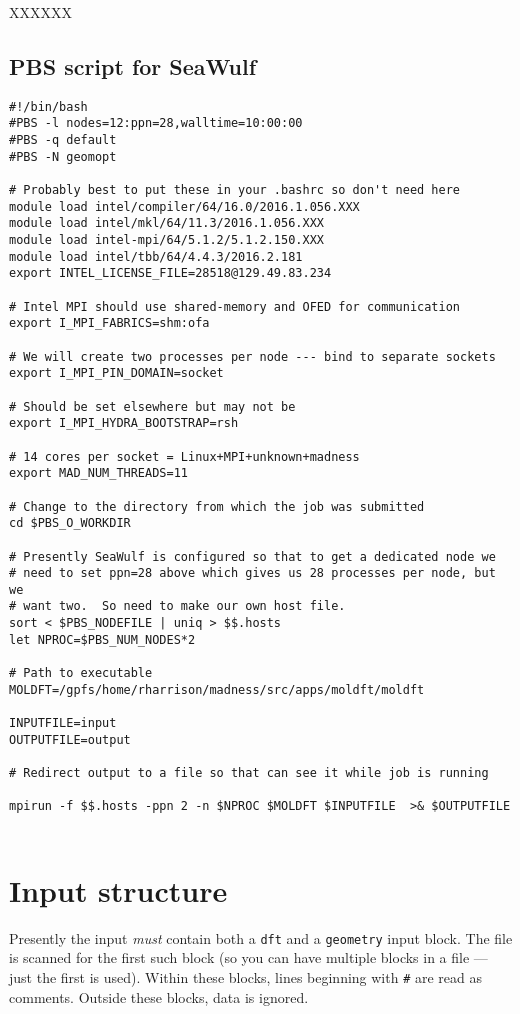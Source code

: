 \documentclass[letterpaper]{book}
\begin{document}
XXXXXX

\subsection{PBS script for SeaWulf}

\begin{verbatim}
#!/bin/bash
#PBS -l nodes=12:ppn=28,walltime=10:00:00
#PBS -q default
#PBS -N geomopt

# Probably best to put these in your .bashrc so don't need here
module load intel/compiler/64/16.0/2016.1.056.XXX
module load intel/mkl/64/11.3/2016.1.056.XXX
module load intel-mpi/64/5.1.2/5.1.2.150.XXX
module load intel/tbb/64/4.4.3/2016.2.181
export INTEL_LICENSE_FILE=28518@129.49.83.234

# Intel MPI should use shared-memory and OFED for communication
export I_MPI_FABRICS=shm:ofa

# We will create two processes per node --- bind to separate sockets
export I_MPI_PIN_DOMAIN=socket

# Should be set elsewhere but may not be
export I_MPI_HYDRA_BOOTSTRAP=rsh

# 14 cores per socket = Linux+MPI+unknown+madness
export MAD_NUM_THREADS=11

# Change to the directory from which the job was submitted
cd $PBS_O_WORKDIR

# Presently SeaWulf is configured so that to get a dedicated node we
# need to set ppn=28 above which gives us 28 processes per node, but we
# want two.  So need to make our own host file.
sort < $PBS_NODEFILE | uniq > $$.hosts
let NPROC=$PBS_NUM_NODES*2

# Path to executable
MOLDFT=/gpfs/home/rharrison/madness/src/apps/moldft/moldft

INPUTFILE=input
OUTPUTFILE=output

# Redirect output to a file so that can see it while job is running

mpirun -f $$.hosts -ppn 2 -n $NPROC $MOLDFT $INPUTFILE  >& $OUTPUTFILE
  
\end{verbatim}


\section{Input structure}

Presently the input {\em must} contain both a \verb+dft+ and a
\verb+geometry+ input block.  The file is scanned for the first such
block (so you can have multiple blocks in a file --- just the first is
used). Within these blocks, lines beginning with \verb+#+ are read as comments.
Outside these blocks, data is ignored.
\end{document}
